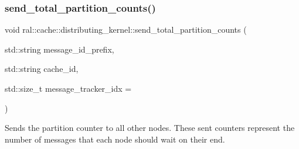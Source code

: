 \mbox{\label{classral_1_1cache_1_1distributing__kernel_a532f4eb42963c4e76199f9250c483a09}} 
\subsubsection{\texorpdfstring{send\+\_\+total\+\_\+partition\+\_\+counts()}{send\_total\_partition\_counts()}}
{\footnotesize\ttfamily void ral\+::cache\+::distributing\+\_\+kernel\+::send\+\_\+total\+\_\+partition\+\_\+counts (\begin{DoxyParamCaption}\item[{std\+::string}]{message\+\_\+id\+\_\+prefix,  }\item[{std\+::string}]{cache\+\_\+id,  }\item[{std\+::size\+\_\+t}]{message\+\_\+tracker\+\_\+idx = {} }\end{DoxyParamCaption})}



Sends the partition counter to all other nodes. These sent counters represent the number of messages that each node should wait on their end. 



